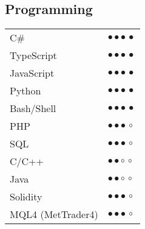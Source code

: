 \documentclass[a4paper,10pt]{article}
\newcommand{\SkillBull}[1]{%
\textcolor{ColorTwo}{#1}
}
\begin{document}
\begin{adjustbox}{valign=t}
\begin{minipage}{0.6\textwidth}
\begin{multicols}{2}
\section*{Programming}
\begin{tabular}{ll}
	C\# 			& \SkillBull{$\bullet \bullet \bullet \, \bullet$}\\
	TypeScript  	& \SkillBull{$\bullet \bullet \bullet \, \bullet$}\\
	JavaScript  	& \SkillBull{$\bullet \bullet \bullet \, \bullet$}\\
	Python   	    & \SkillBull{$\bullet \bullet \bullet \, \bullet$}\\
	Bash/Shell    & \SkillBull{$\bullet \bullet \bullet \, \bullet$}\\
	PHP  		    & \SkillBull{$\bullet \bullet \bullet \, \circ$}\\
	SQL 		    & \SkillBull{$\bullet \bullet \bullet \, \circ$}\\
	C/C++        	& \SkillBull{$\bullet \bullet \circ \, \circ$}\\
	Java        	& \SkillBull{$\bullet \bullet \circ \, \circ$}\\
	Solidity        & \SkillBull{$\bullet \bullet \bullet \, \circ$}\\
	MQL4 (MetTrader4)& \SkillBull{$\bullet \bullet \bullet \, \circ$}\\
\end{tabular}

\vfill\null \columnbreak  %


\end{multicols}
\end{minipage}
\end{adjustbox}
\end{document}
